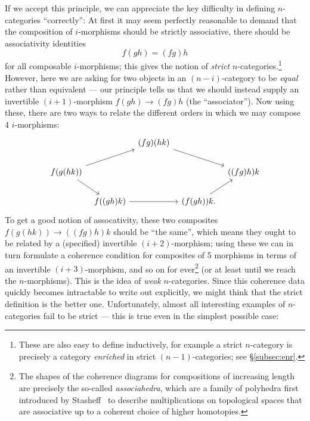 \documentclass[a4paper,12pt]{article}
\begin{document}
If we accept this principle, we can appreciate the key difficulty in
defining $n$-categories ``correctly'': At first it may seem perfectly
reasonable to demand that the composition of $i$-morphisms should be
strictly associative, \ie{} there should be associativity identities
\[f(gh) = (fg)h\] for all composable $i$-morphisms; this gives the
notion of \emph{strict} $n$-categories.\footnote{These are also easy to
define inductively, for example a strict $n$-category is precisely a
category \emph{enriched} in strict $(n-1)$-categories; see \S\ref{subsec:enr}.}
However, here we are asking for two objects in an $(n-i)$-category to be \emph{equal}
rather than equivalent --- our principle tells us that we should instead 
supply an invertible
$(i+1)$-morphism $f(gh) \to (fg)h$ (the ``associator''). Now using these,
there are two ways to relate the different orders in which we may
compose 4 $i$-morphisms:
\begin{equation}
  \label{eq:pentagon}
  \begin{tikzcd}[column sep=tiny]
    {} &  & (fg)(hk) \arrow{drr}\\
    f(g(hk)) \arrow{dr}\arrow{urr} & & & & ((fg)h)k \\
    & f((gh)k) \arrow{rr} & & (f(gh))k. \arrow{ur}
  \end{tikzcd}
\end{equation}
To get a good notion of assocativity, these two composites
$f(g(hk)) \to ((fg)h)k$ should be ``the same'', which means they ought
to be related by a (specified) invertible $(i+2)$-morphism; using
these we can in turn formulate a coherence condition for composites of
5 morphisms in terms of an invertible $(i+3)$-morphism, and so on for
ever\footnote{The shapes of the coherence diagrams for compositions of
  increasing length are precisely the so-called \emph{associahedra},
  which are a family of polyhedra first introduced by
  Stasheff~\cite{Stasheff} to describe multiplications on topological
  spaces that are associative up to a coherent choice of higher
  homotopies.}
(or at least until we reach the
$n$-morphisms). This is the idea of \emph{weak} $n$-categories. Since
this coherence data quickly becomes intractable to write out
explicitly, we might think that the strict definition is the better
one. Unfortunately, almost all interesting examples of $n$-categories
fail to be strict --- this is true even in the simplest possible case:
\end{document}
